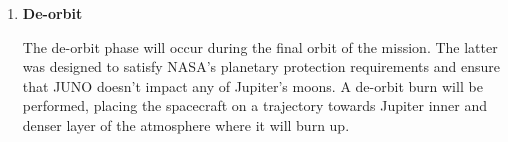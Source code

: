 \begin{enumerate}
    \item \textbf{De-orbit}
    
    The de-orbit phase will occur during the final orbit of the mission. The latter was designed to satisfy NASA's planetary protection requirements and ensure that JUNO doesn't impact any of Jupiter's moons. A de-orbit burn will be performed, placing the spacecraft on a trajectory towards Jupiter inner and denser layer of the atmosphere where it will burn up.   
     
\end{enumerate}